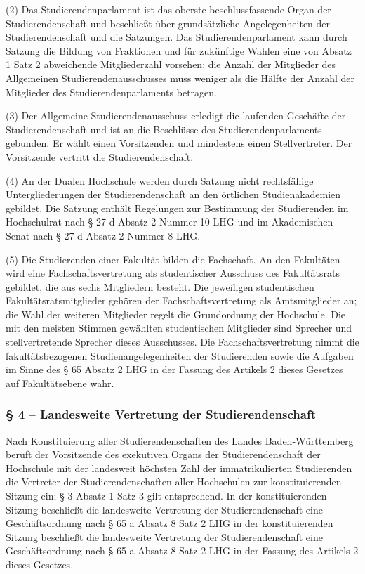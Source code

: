 \documentclass[
10pt,
a4paper,
twoside,								%
titlepage=false,							%
draft=false								%
]{scrartcl}
\begin{document}
(2) Das Studierendenparlament ist das oberste beschlussfassende Organ der Studierendenschaft und beschließt über grundsätzliche Angelegenheiten der Studierendenschaft und die Satzungen. Das Studierendenparlament kann durch Satzung die Bildung von Fraktionen und für zukünftige Wahlen eine von Absatz 1 Satz 2 abweichende Mitgliederzahl vorsehen; die Anzahl der Mitglieder des Allgemeinen Studierendenausschusses muss weniger als die Hälfte der Anzahl der Mitglieder des
Studierendenparlaments betragen.

(3) Der Allgemeine Studierendenausschuss erledigt die laufenden Geschäfte der Studierendenschaft und ist an die Beschlüsse des Studierendenparlaments gebunden. Er wählt einen Vorsitzenden und mindestens einen Stellvertreter. Der Vorsitzende vertritt die Studierendenschaft.

(4) An der Dualen Hochschule werden durch Satzung nicht rechtsfähige Untergliederungen der Studierendenschaft an den örtlichen Studienakademien gebildet. Die Satzung enthält Regelungen zur Bestimmung der Studierenden im Hochschulrat nach § 27 d Absatz 2 Nummer 10 LHG und im Akademischen Senat nach § 27 d Absatz 2 Nummer 8 LHG.

(5) Die Studierenden einer Fakultät bilden die Fachschaft. An den Fakultäten wird eine Fachschaftsvertretung als studentischer Ausschuss des Fakultätsrats gebildet, die aus sechs Mitgliedern besteht. Die jeweiligen studentischen Fakultätsratsmitglieder gehören der Fachschaftsvertretung als Amtsmitglieder an; die Wahl der weiteren Mitglieder regelt die Grundordnung der Hochschule. Die mit den meisten Stimmen gewählten studentischen Mitglieder sind Sprecher und stellvertretende Sprecher dieses Ausschusses. Die Fachschaftsvertretung nimmt die fakultätsbezogenen Studienangelegenheiten der Studierenden sowie die Aufgaben im Sinne des § 65 Absatz 2 LHG in der Fassung des Artikels 2 dieses Gesetzes auf Fakultätsebene wahr.


\subsubsection*{§ 4 – Landesweite Vertretung der Studierendenschaft}

Nach Konstituierung aller Studierendenschaften des Landes Baden-Württemberg beruft der Vorsitzende des exekutiven Organs der Studierendenschaft der Hochschule mit der landesweit höchsten Zahl der immatrikulierten Studierenden die Vertreter der Studierendenschaften aller Hochschulen zur konstituierenden Sitzung ein; § 3 Absatz 1 Satz 3 gilt entsprechend. In der konstituierenden Sitzung beschließt die landesweite Vertretung der Studierendenschaft eine Geschäftsordnung nach § 65 a Absatz 8 Satz 2 LHG in der konstituierenden Sitzung beschließt die landesweite Vertretung der Studierendenschaft eine Geschäftsordnung nach § 65 a Absatz 8 Satz 2 LHG in der Fassung des Artikels 2 dieses Gesetzes.
\end{document}
